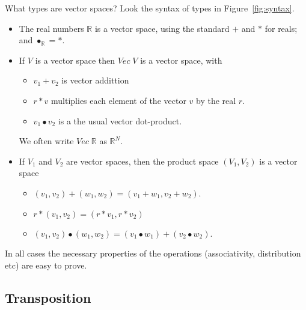 \documentclass[sigplan,review]{acmart}
\renewcommand{\vector}[1]{\mathit{Vec}\;#1}
\newcommand{\real}{\mathbb{R}}       %
\newcommand{\dotprod}{\bullet}    %
\begin{document}
What types are vector spaces?  Look the syntax of types in Figure~\ref{fig:syntax}.
\begin{itemize}
  \item The real numbers $\real$ is a vector space, using the standard $+$ and $*$ for reals; and $\dotprod_{\real} = *$.
  \item If $V$ is a vector space then $\vector{V}$ is a vector space, with
    \begin{itemize}
      \item $v_1 + v_2$ is vector addittion
      \item $r * v$ multiplies each element of the vector $v$ by the real $r$.
      \item $v_1 \dotprod v_2$ is a the usual vector dot-product.
    \end{itemize}
    We often write $\vector{\real}$ as $\real^N$.
  \item If $V_1$ and $V_2$ are vector spaces, then the product space $(V_1, V_2)$ is a vector space
    \begin{itemize}
      \item $(v_1,v_2) +(w_1,w_2) = (v_1 + w_1, v_2 + w_2)$.
      \item $r * (v_1,v_2) = (r*v_1, r*v_2)$
      \item $(v_1,v_2) \dotprod (w_1,w_2) = (v_1 \dotprod w_1) + (v_2 \dotprod w_2)$.
    \end{itemize}
\end{itemize}    
In all cases the necessary properties of the operations (associativity, distribution etc) are easy to prove.

\subsection{Transposition}
\end{document}
